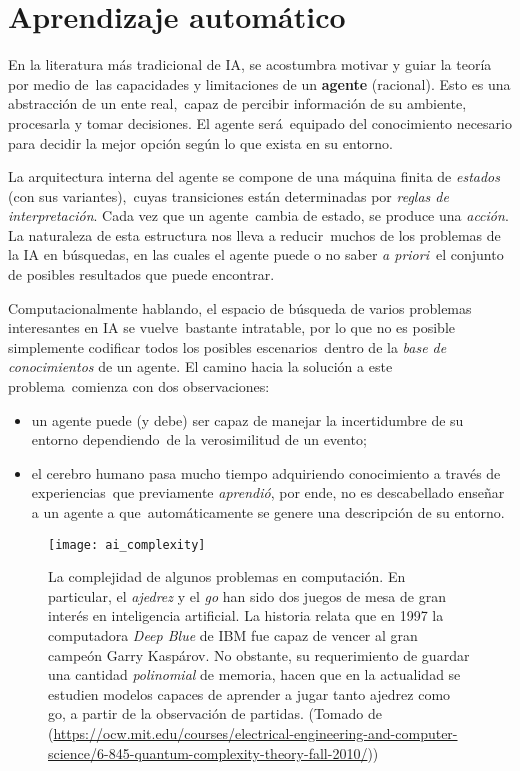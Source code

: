 \section{Aprendizaje automático}

\noindent
En la literatura más tradicional de IA, se acostumbra motivar y guiar la teoría por medio de\
las capacidades y limitaciones de un \textbf{agente} (racional). Esto es una abstracción de un ente real,\
capaz de percibir información de su ambiente, procesarla y tomar decisiones. El agente será\
equipado del conocimiento necesario para decidir la mejor opción según lo que exista en su entorno.\par
La arquitectura interna del agente se compone de una máquina finita de \emph{estados} (con sus variantes),\
cuyas transiciones están determinadas por \emph{reglas de interpretación}. Cada vez que un agente\
cambia de estado, se produce una \emph{acción}. La naturaleza de esta estructura nos lleva a reducir\
muchos de los problemas de la IA en búsquedas, en las cuales el agente puede o no saber \emph{a priori}\
el conjunto de posibles resultados que puede encontrar.\par
Computacionalmente hablando, el espacio de búsqueda de varios problemas interesantes en IA se vuelve\
bastante intratable, por lo que no es posible simplemente codificar todos los posibles escenarios\
dentro de la \emph{base de conocimientos} de un agente. El camino hacia la solución a este problema\
comienza con dos observaciones:
\begin{itemize}
\item un agente puede (y debe) ser capaz de manejar la incertidumbre de su entorno dependiendo\
  de la verosimilitud de un evento;
\item el cerebro humano pasa mucho tiempo adquiriendo conocimiento a través de experiencias\
  que previamente \emph{aprendió}, por ende, no es descabellado enseñar a un agente a que\
  automáticamente se genere una descripción de su entorno.
\end{itemize}

\begin{figure}[H]
  \centering
  \texttt{[image: ai\_complexity]}
  \caption{La complejidad de algunos problemas en computación. En particular, el \emph{ajedrez}
    y el \emph{go} han sido dos juegos de mesa de gran interés en inteligencia artificial. La historia
    relata que en 1997 la computadora \emph{Deep Blue} de IBM fue capaz de vencer al gran campeón Garry Kaspárov.
    No obstante, su requerimiento de guardar una cantidad \emph{polinomial} de memoria, hacen que en la
    actualidad se estudien modelos capaces de aprender a jugar tanto ajedrez como go, a partir de la observación de partidas.
    (Tomado de (\url{https://ocw.mit.edu/courses/electrical-engineering-and-computer-science/6-845-quantum-complexity-theory-fall-2010/}))}
\end{figure}


